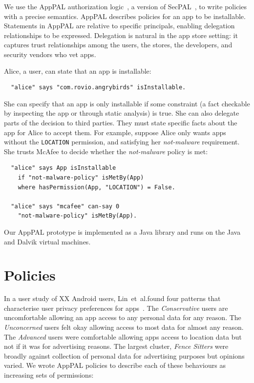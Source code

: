 \documentclass[]{soups-poster}
\makeatletter
\newcommand{\etal}[0]{et~al.\@ }
\newcommand{\citep}[1]{\cite{#1}}
\makeatother
\begin{document}
We use the AppPAL authorization logic~\citep{Hallett:2014un}, a version
of SecPAL~\citep{Becker:2006vh}, to write policies with a precise semantics.
AppPAL describes policies for an app to be installable.
Statements in AppPAL are relative to specific principals,
enabling delegation relationships to be expressed.
Delegation is natural in the app store setting: it
captures trust relationships among the users,
the stores, the developers, and security vendors who vet apps.

Alice, a user, can state that an app is installable:
\begin{lstlisting}
  "alice" says "com.rovio.angrybirds" isInstallable.
\end{lstlisting}
She can specify that an app is only installable if some constraint (a fact checkable by inspecting the app or through static analysis) is true.
She can also delegate parts of the decision to third parties.
They must state specific facts about the app for Alice to accept them.
For example, suppose Alice only wants apps without the \texttt{LOCATION} permission,
and satisfying her \emph{not-malware} requirement.
She trusts McAfee to decide whether the \emph{not-malware} policy is met:
\begin{lstlisting}
  "alice" says App isInstallable
    if "not-malware-policy" isMetBy(App)
    where hasPermission(App, "LOCATION") = False.

  "alice" says "mcafee" can-say 0
    "not-malware-policy" isMetBy(App).
\end{lstlisting}
Our AppPAL prototype is implemented as a Java library and runs on the
Java and Dalvik virtual machines.

\section{Policies}

In a user study of XX Android users,  %
Lin~\etal found four patterns that characterise
user privacy preferences for apps~\citep{Sadeh:2014vq}.
The \emph{Conservative} users are uncomfortable allowing an app access to any personal data for any reason.
The \emph{Unconcerned} users felt okay allowing access to most data for almost any reason.
The \emph{Advanced} users were comfortable allowing apps access to location data but not if it was for advertising reasons.
The largest cluster, \emph{Fence Sitters} were broadly against collection of personal data for advertising purposes but opinions varied.
We wrote AppPAL policies to describe each of these behaviours as
increasing sets of permissions:
\end{document}
